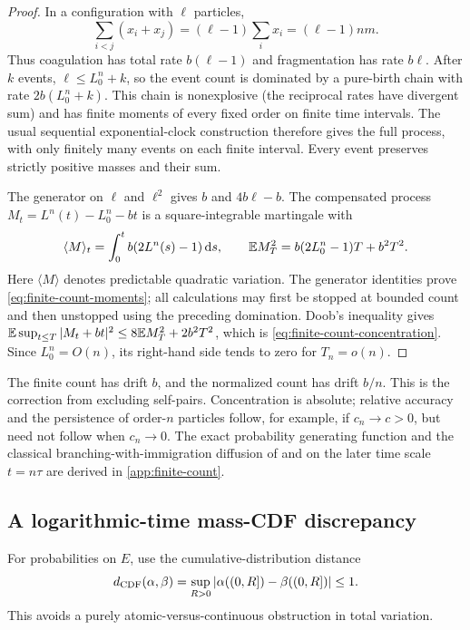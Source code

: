 \begin{proof}
In a configuration with $\ell$ particles,
\[
 \sum_{i<j}(x_i+x_j)=(\ell-1)\sum_i x_i=(\ell-1)nm.
\]
Thus coagulation has total rate $b(\ell-1)$ and fragmentation has rate
$b\ell$. After $k$ events, $\ell\leq L_0^n+k$, so the event count is
dominated by a pure-birth chain with rate $2b(L_0^n+k)$. This chain is
nonexplosive (the reciprocal rates have divergent sum) and has finite
moments of every fixed order on finite time intervals. The usual sequential
exponential-clock construction therefore gives the full process, with only
finitely many events on each finite interval. Every event preserves strictly
positive masses and their sum.

The generator on $\ell$ and $\ell^2$ gives $b$ and $4b\ell-b$.
The compensated process $M_t=L^n(t)-L_0^n-bt$ is a square-integrable
martingale with
\begin{equation}
 \langle M\rangle_t=\int_0^t b(2L^n(s)-1)\,\mathrm d s,
 \qquad
 \mathbb E M_T^2=b(2L_0^n-1)T+b^2T^2.
 \label{eq:count-bracket}
\end{equation}
Here $\langle M\rangle$ denotes predictable quadratic variation.
The generator identities prove \eqref{eq:finite-count-moments}; all
calculations may first be stopped at bounded count and then unstopped
using the preceding domination. Doob's inequality gives
$\mathbb E\sup_{t\leq T}|M_t+bt|^2\leq8\mathbb E M_T^2+2b^2T^2$,
which is \eqref{eq:finite-count-concentration}. Since $L_0^n=O(n)$, its
right-hand side tends to zero for $T_n=o(n)$.
\end{proof}

The finite count has drift $b$, and the normalized count has drift $b/n$.
This is the correction from excluding self-pairs. Concentration is absolute;
relative accuracy and the persistence of order-$n$ particles follow, for
example, if $c_n\to c>0$, but need not follow when $c_n\to0$.
The exact probability generating function and the classical
branching-with-immigration diffusion of \citet{Feller1951} and
\citet{KawazuWatanabe1971} on the later time scale $t=n\tau$ are derived
in \cref{app:finite-count}.

\subsection{A logarithmic-time mass-CDF discrepancy}

For probabilities on $E$, use the cumulative-distribution distance
\[
 d_{\rm CDF}(\alpha,\beta)
 =\sup_{R>0}|\alpha((0,R])-\beta((0,R])|\leq1.
\]
This avoids a purely atomic-versus-continuous obstruction in total variation.

